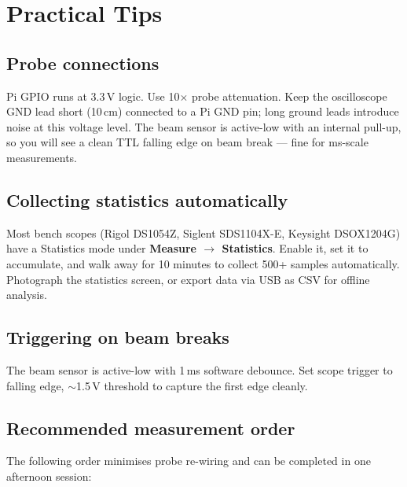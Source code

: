 \documentclass[11pt, a4paper]{article}
\begin{document}
\newpage

\section*{Practical Tips}

\subsection*{Probe connections}

Pi GPIO runs at 3.3\,V logic. Use 10$\times$ probe attenuation. Keep the
oscilloscope GND lead short (10\,cm) connected to a Pi GND pin; long ground
leads introduce noise at this voltage level. The beam sensor is active-low
with an internal pull-up, so you will see a clean TTL falling edge on beam
break --- fine for ms-scale measurements.

\subsection*{Collecting statistics automatically}

Most bench scopes (Rigol DS1054Z, Siglent SDS1104X-E, Keysight DSOX1204G)
have a Statistics mode under \textbf{Measure $\rightarrow$ Statistics}. Enable
it, set it to accumulate, and walk away for 10 minutes to collect 500+ samples
automatically. Photograph the statistics screen, or export data via USB as CSV
for offline analysis.

\subsection*{Triggering on beam breaks}

The beam sensor is active-low with 1\,ms software debounce. Set scope trigger
to falling edge, $\sim$1.5\,V threshold to capture the first edge cleanly.

\subsection*{Recommended measurement order}

The following order minimises probe re-wiring and can be completed in one
afternoon session:
\end{document}
